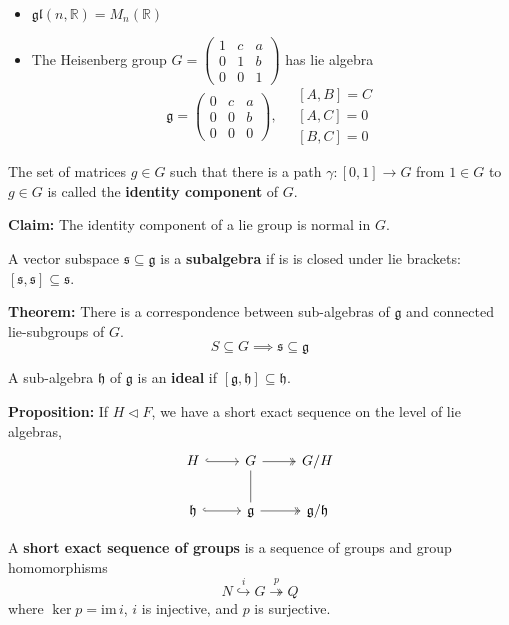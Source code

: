 \documentclass[12pt]{article}
\newcommand{\R}{\mathbb{R}}
\newcommand{\g}{\mathfrak{g}}
\newcommand{\h}{\mathfrak{h}}
\newcommand{\gl}{\mathfrak{gl}}
\newcommand{\im}{\text{im}\,}
\begin{document}
\begin{itemize}
    \item $\gl(n, \R) = M_n(\R)$
    \item The Heisenberg group $G = \begin{pmatrix}
        1 & c & a\\ 
        0 & 1 & b\\ 
        0 & 0 & 1
    \end{pmatrix}$ has lie algebra 
    \[\g = \begin{pmatrix}
        0 & c& a\\ 
        0 & 0 & b\\ 
        0 & 0 & 0
    \end{pmatrix}, \quad \begin{array}{c}
        \mbox{$[A, B] = C$}\\ 
        \mbox{$[A, C] = 0$}\\
        \mbox{$[B, C] = 0$}
    \end{array}\]
    
\end{itemize}

The set of matrices $g \in G$ such that there is a path $\gamma: [0, 1] \to G$ from $1 \in G$ to $g \in G$ is called the \textbf{identity component} of $G$.

\textbf{Claim:} The identity component of a lie group is normal in $G$. 

A vector subspace $\mathfrak{s} \subseteq \g$ is a \textbf{subalgebra} if is is closed under lie brackets: $[\mathfrak{s}, \mathfrak{s}] \subseteq \mathfrak{s}$.

\textbf{Theorem:} There is a correspondence between sub-algebras of $\g$ and connected lie-subgroups of $G$. 
\[S \subseteq G \implies \mathfrak{s} \subseteq \g\]

A sub-algebra $\h$ of $\g$ is an \textbf{ideal} if $[\g, \h] \subseteq \h$. 

\textbf{Proposition:} If $H \triangleleft F$, we have a short exact sequence on the level of lie algebras, 
\[\begin{tikzcd}
    H \arrow[hook]{r} & G \arrow[two heads]{r} & G/H\\ 
    \h \arrow[hook]{r} & \g \arrow[no head]{u} \arrow[two heads]{r} & \g/\h
\end{tikzcd}\]

A \textbf{short exact sequence of groups} is a sequence of groups and group homomorphisms
\[N \overset{i}{\hookrightarrow} G \overset{p}{\twoheadrightarrow} Q\]
where $\ker p = \im i$, $i$ is injective, and $p$ is surjective. 
\end{document}
